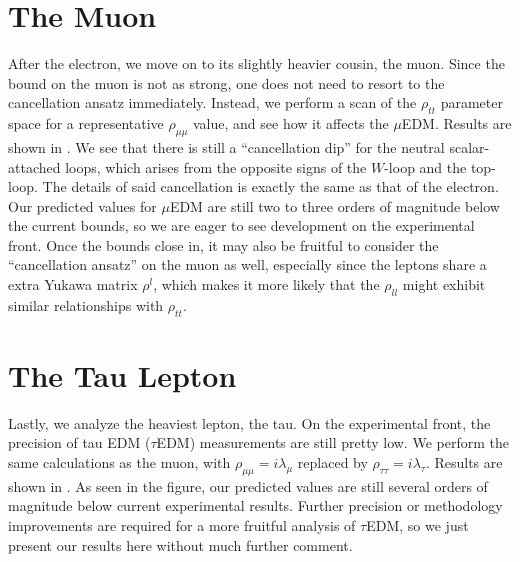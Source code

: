 \section{The Muon}\label{sec:muEDM}
After the electron, we move on to its slightly heavier cousin, the muon. 
Since the bound on the muon is not as strong, one does not need to resort to the cancellation ansatz immediately.
Instead, we perform a scan of the \(\rho_{tt} \) parameter space for a representative \(\rho_{\mu\mu} \) value, and see how it affects the \(\mu \)EDM.
Results are shown in .
We see that there is still a ``cancellation dip'' for the neutral scalar-attached loops, which arises from the opposite signs of the \(W \)-loop and the top-loop.
The details of said cancellation is exactly the same as that of the electron.
Our predicted values for \(\mu \)EDM are still two to three orders of magnitude below the current bounds, so we are eager to see development on the experimental front.
Once the bounds close in, it may also be fruitful to consider the ``cancellation ansatz'' on the muon as well, especially since the leptons share a extra Yukawa matrix \(\rho^{l} \),
which makes it more likely that the \(\rho_{ll} \) might exhibit similar relationships with \(\rho_{tt} \).

\section{The Tau Lepton}\label{sec:tauEDM}
Lastly, we analyze the heaviest lepton, the tau.
On the experimental front, the precision of tau EDM (\(\tau \)EDM) measurements are still pretty low.
We perform the same calculations as the muon, with \(\rho_{\mu\mu} = i\lambda_{\mu} \) replaced by \(\rho_{\tau\tau} = i\lambda_{\tau} \).
Results are shown in .
As seen in the figure, our predicted values are still several orders of magnitude below current experimental results.
Further precision or methodology improvements are required for a more fruitful analysis of \(\tau \)EDM, so we just present our results here without much further comment.

\clearpage

